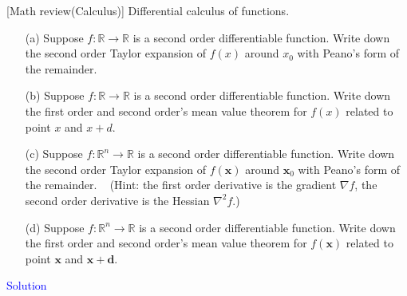 \item {} [Math review(Calculus)] Differential calculus of functions.

\begin{itemize}
    \item[(a)] Suppose $f: \mathbb{R} \rightarrow \mathbb{R}$ is a second order differentiable function. Write down the second order Taylor expansion of $f(x)$ around $x_0$ with Peano's form of the remainder. ~
    \item[(b)] Suppose $f: \mathbb{R} \rightarrow \mathbb{R}$ is a second order differentiable function. Write down the first order and second order's mean value theorem for $f(x)$ related to point $x$ and $x+d$. ~
    \item[(c)] Suppose $f: \mathbb{R}^n\rightarrow \mathbb{R}$ is a second order differentiable function. Write down the second order Taylor expansion of $f(\mathbf{x})$ around $\mathbf{x}_0$ with Peano's form of the remainder. ~ (Hint: the first order derivative is the gradient $\nabla f$, the second order derivative is the Hessian $\nabla^2 f$.)
    \item[(d)] Suppose $f: \mathbb{R}^n\rightarrow \mathbb{R}$ is a second order differentiable function. Write down the first order and second order's mean value theorem for $f(\mathbf{x})$ related to point $\mathbf{x}$ and $\mathbf{x}+\mathbf{d}$. ~
\end{itemize}

\textcolor{blue}{Solution} \\








\newpage